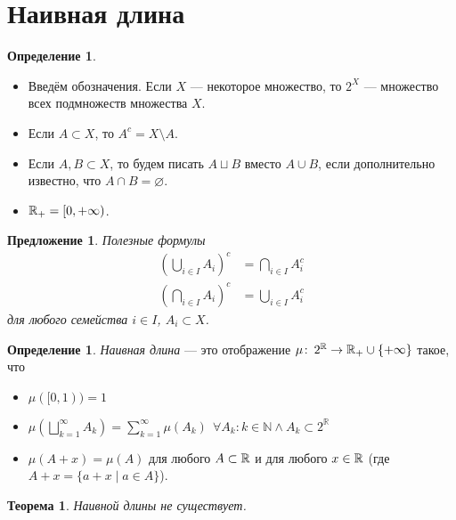 \documentclass[a4paper,12pt]{article}
\newcounter{theoremCnt}
\theoremstyle{definition}
\newtheorem{df}[theoremCnt]{Определение}
\theoremstyle{plain}
\newtheorem{thm}[theoremCnt]{Теорема}
\theoremstyle{plain}
\theoremstyle{plain}
\theoremstyle{plain}
\newtheorem{prop}[theoremCnt]{Предложение}
\theoremstyle{definition}
\theoremstyle{definition}
\theoremstyle{definition}
\theoremstyle{definition}
\theoremstyle{definition}
\theoremstyle{definition}
\theoremstyle{plain}
\theoremstyle{plain}
\theoremstyle{plain}
\theoremstyle{plain}
\theoremstyle{definition}
\theoremstyle{definition}
\theoremstyle{definition}
\theoremstyle{definition}
\theoremstyle{definition}
\newcommand{\R}{\ensuremath \mathbb{R}}
\begin{document}
\section{Наивная длина}

\begin{df}\
 \begin{itemize}
  \item Введём обозначения. Если $ X $ --- некоторое множество, то $ 2^X $ --- множество всех подмножеств множества $ X $.
  \item Если $ A \subset X $, то $ A^c = X \setminus A $.
  \item Если $ A, B \subset X $, то будем писать $ A \sqcup B $ вместо $ A \cup B $, если дополнительно известно, что $ A \cap B = \varnothing $.
  \item $ \R_+ = [0, +\infty) $.
 \end{itemize}
\end{df}
\begin{prop}
 Полезные формулы
 \begin{align*}
  \left( \bigcup_{i \in I} A_i \right)^c &= \bigcap_{i \in I} A_i^c \\
  \left( \bigcap_{i \in I} A_i \right)^c &= \bigcup_{i \in I} A_i^c
 \end{align*} для любого семейства $ i \in I $, $ A_i \subset X $.
\end{prop}
\begin{df}
 \textit{Наивная длина} --- это отображение $ \mu \colon\, 2^\R \to \R_+ \cup \{ +\infty \} $ такое, что
 \begin{itemize}
  \item $ \mu ([0, 1)) = 1 $
  \item $ \displaystyle \mu\left( \bigsqcup_{k=1}^\infty A_k \right) = \sum_{k=1}^\infty \mu( A_k ) \ \ \forall { A_k } : {k \in \mathbb{N}} \land {A_k \subset 2^{\mathbb{R}}} $
  \item $ \mu(A + x) = \mu(A) $ для любого $ A \subset \R $ и для любого $ x \in \R $ (где $ A + x = \{ a + x \mid a \in A \} $).
 \end{itemize}
\end{df}
\begin{thm}
 Наивной длины не существует.
\end{thm}
\end{document}
